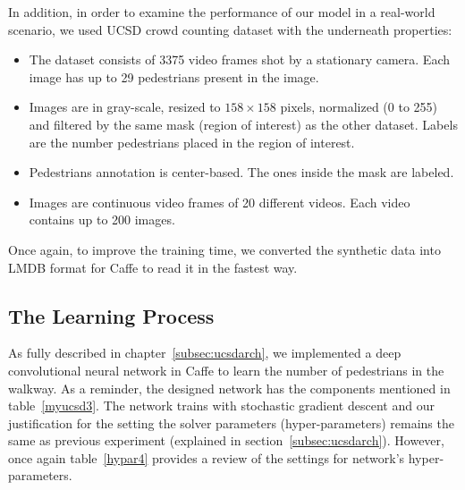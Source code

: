 \noindent In addition, in order to examine the performance of our model in a real-world scenario, we used UCSD crowd counting dataset \cite{chan2008privacy} with the underneath properties:

\begin{itemize}
\item The dataset consists of 3375 video frames shot by a stationary camera. Each image has up to 29 pedestrians present in the image.
\item Images are in gray-scale, resized to $158\times158$ pixels, normalized (0 to 255) and filtered by the same mask (region of interest) as the other dataset. Labels are the number pedestrians placed in the region of interest.
\item Pedestrians annotation is center-based. The ones inside the mask are labeled.  
\item Images are continuous video frames of 20 different videos. Each video contains up to 200 images.  
\end{itemize}

Once again, to improve the training time, we converted the synthetic data into LMDB format for Caffe to read it in the fastest way.


\subsection{The Learning Process}

As fully described in chapter~\ref{subsec:ucsdarch}, we implemented a deep convolutional neural network in Caffe to learn the number of pedestrians in the walkway. As a reminder, the designed network has the components mentioned in table~\ref{myucsd3}. The network trains with stochastic gradient descent and our justification for the setting the solver parameters (hyper-parameters) remains the same as previous experiment (explained in section~\ref{subsec:ucsdarch}). However, once again table~\ref{hypar4} provides a review of the settings for network's hyper-parameters.

